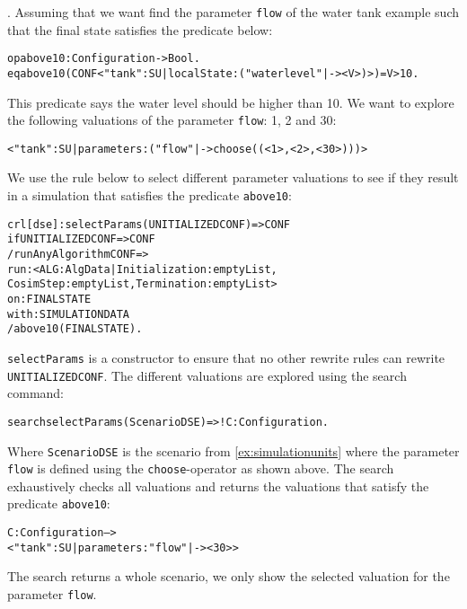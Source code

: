 \begin{example}\label{ex:dse}.
  Assuming that we want find the parameter \texttt{flow} of the water tank example such that the final state satisfies the predicate below:

  \scriptsize
  \begin{alltt}
op above10 : Configuration -> Bool .
eq above10(CONF < "tank" : SU | localState : ( "waterlevel" |-> < V >) >) = V > 10 .  
  \end{alltt}
  \normalsize

This predicate says the water level should be higher than 10.
We want to explore the following valuations of the parameter \texttt{flow}: 1, 2 and 30:

\small
\begin{alltt}
< "tank" : SU | parameters : ("flow" |-> choose((< 1 >,< 2 >,< 30 >))) >
\end{alltt}
\normalsize

We use the rule below to select different parameter valuations to see if they result in a simulation that satisfies the predicate \texttt{above10}:

\small
\begin{alltt}
  crl [dse] : selectParams(UNITIALIZEDCONF) => CONF 
  if UNITIALIZEDCONF => CONF
  / runAnyAlgorithm CONF => 
      run: < ALG : AlgData | Initialization : emptyList, 
      CosimStep : emptyList, Termination : emptyList > 
      on: FINALSTATE
      with: SIMULATIONDATA
  / above10(FINALSTATE) .
\end{alltt}
\normalsize

\texttt{selectParams} is a constructor to ensure that no other rewrite rules can rewrite \texttt{UNITIALIZEDCONF}.
The different valuations are explored using the search command:

\small
\begin{alltt}
  search selectParams(ScenarioDSE)  =>! C:Configuration .
\end{alltt}
\normalsize

Where \texttt{ScenarioDSE} is the scenario from \cref{ex:simulationunits} where the parameter \texttt{flow} is defined using the \texttt{choose}-operator as shown above.
The search exhaustively checks all valuations and returns the valuations that satisfy the predicate \texttt{above10}:

\small
\begin{alltt}
C:Configuration --> 
  < "tank" : SU | parameters : "flow" |-> < 30 > >
\end{alltt}
\normalsize

The search returns a whole scenario, we only show the selected valuation for the parameter \texttt{flow}.
\end{example}

